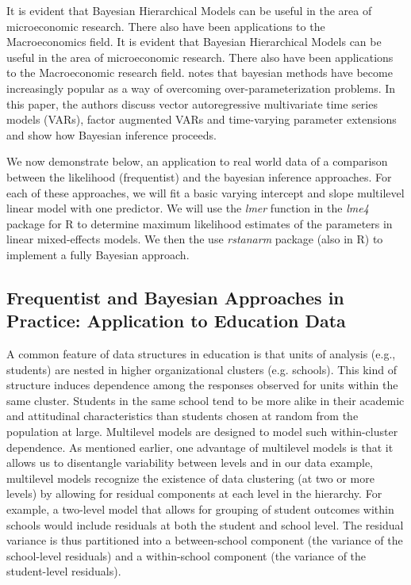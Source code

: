 It is evident that Bayesian Hierarchical Models can be useful in the area of microeconomic research. There also have been applications to the Macroeconomics field. It is evident that Bayesian Hierarchical Models can be useful in the area of microeconomic research. There also have been applications to the Macroeconomic research field. \cite{ koop2010bayesian} notes that bayesian methods have become increasingly popular as a way of overcoming over-parameterization problems. In this paper, the authors discuss vector autoregressive multivariate time
series models (VARs), factor augmented VARs and time-varying parameter extensions and show how Bayesian inference proceeds. 

We now demonstrate below, an application to real world data of a comparison between the likelihood (frequentist)  and the bayesian inference approaches. For each of these approaches, we will fit a basic varying intercept and slope multilevel linear model with one predictor. We will use the \textit{lmer} function in the \textit{lme4} package for R to determine maximum likelihood estimates of the parameters in linear mixed-effects models. We then the use \textit{rstanarm} package (also in R) to implement a fully Bayesian approach.




\subsection{Frequentist and Bayesian Approaches in Practice: Application to Education Data}

A common feature of data structures in education is that units of analysis (e.g., students) are nested in higher organizational clusters (e.g. schools). This kind of structure induces dependence among the responses observed for units within the same cluster. Students in the same school tend to be more alike in their academic and attitudinal characteristics than students chosen at random from the population at large. Multilevel models are designed to model such within-cluster dependence. As mentioned earlier, one advantage of multilevel models is that it allows us to disentangle variability between levels and in our data example,  multilevel models recognize the existence of data clustering (at two or more levels) by allowing for residual components at each level in the hierarchy. For example, a two-level model that allows for grouping of student outcomes within schools would include residuals at both the student and school level. The residual variance is thus partitioned into a between-school component (the variance of the school-level residuals) and a within-school component (the variance of the student-level residuals). 


